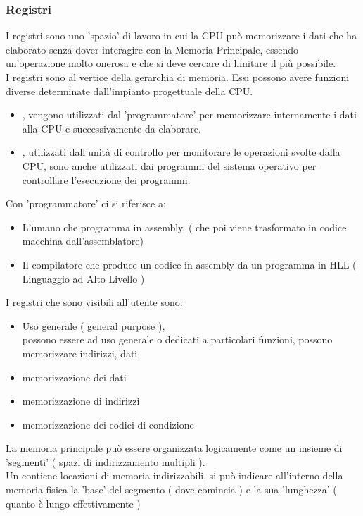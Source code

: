\documentclass[arch.tex]{subfiles}
\begin{document}
\subsubsection{Registri}
I registri sono uno 'spazio' di lavoro in cui la CPU può memorizzare i dati che ha 
elaborato senza dover interagire con la Memoria Principale, essendo un'operazione molto onerosa
e che si deve cercare di limitare il più possibile.\\
I registri sono al vertice della gerarchia di memoria. Essi possono avere funzioni diverse
determinate dall'impianto progettuale della CPU.

%
\label{ppar:Tipi di Registri}



\begin{itemize}
	\item {}, vengono utilizzati dal 'programmatore' per memorizzare internamente
		i dati alla CPU e successivamente da elaborare.
	\item {}, utilizzati dall'unità di controllo per monitorare
		le operazioni svolte dalla CPU, sono anche utilizzati dai programmi del sistema
		operativo per controllare l'esecuzione dei programmi.
\end{itemize}
Con 'programmatore' ci si riferisce a:
\begin{itemize}
	\item L'umano che programma in assembly, ( che poi viene trasformato in codice macchina
		dall'assemblatore)
	\item Il compilatore che produce un codice in assembly da un programma in HLL 
		( Linguaggio ad Alto Livello ) 
\end{itemize}
I registri che sono visibili all'utente sono:
\begin{itemize}
	\item Uso generale ( general purpose ),\\
		possono essere ad uso generale o dedicati a particolari funzioni, possono
		memorizzare indirizzi, dati
	\item memorizzazione dei dati
	\item memorizzazione di indirizzi
	\item memorizzazione dei codici di condizione
\end{itemize}
La memoria principale può essere organizzata logicamente come un insieme di
'segmenti' ( spazi di indirizzamento multipli ).\\
Un  contiene locazioni di memoria indirizzabili, si può indicare
all'interno della memoria fisica la 'base' del segmento ( dove comincia ) e la sua
'lunghezza' ( quanto è lungo effettivamente ) 
\end{document}
